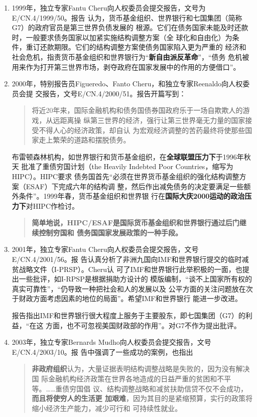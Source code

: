 \begin{enumerate}
\item 1999年，独立专家Fantu Cheru向人权委员会提交报告，文号为E/CN.4/1999/50。报告
  认为，货币基金组织、世界银行和七国集团（简称G7）的政府官员是第三世界负债发展的
  根源。它们在债务国家未能及时还款时，一般要求债务国家以加紧实施结构调整方案（全
  球化和自由化）为条件，重订还款期限。它们的结构调整方案使债务国家陷入更为严重的
  经济和社会危机，指责货币基金组织和世界银行为“\textbf{新自由派反革命}”，“债务
  危机被用来作为打开第三世界市场，剥夺政府在国家发展中的作用的方便借口”。

\item 2000年，特别报告员Figueredo、Fanto Cheru，和独立专家Reenaldo向人权委员会提
  交报告，文号E/CN.4/2000/51。报告开篇写到：
  \begin{quotation}
    将近20年来，国际金融机构和债务国债券国政府乐于一场自欺欺人的游戏，从远距离操
    纵第三世界的经济，强行让第三世界毫无力量的国家接受不得人心的经济政策，却自认
    为宏观经济调整的苦药最终将使那些国家走上繁荣的道路和摆脱债务。
  \end{quotation}
  布雷顿森林机构，如世界银行和货币基金组织，在\textbf{全球联盟压力下}于1996年秋天
  批准了重债穷国计划（the Heavily Indebted Poor Countries，缩写为HIPC）。HIPC要求
  债务国首先“必须在世界货币基金组织的强化结构调整方案（ESAF）下完成六年的结构调
  整，然后作出减免债务的决定要满足一些额外条件”。1999年春，货币基金组织和世界银
  行在\textbf{国际大庆2000运动的政治压力下}对HIPC作检讨。
  \begin{quotation}
    \textbf{简单地说，HIPC/ESAF是国际货币基金组织和世界银行通过后门继续控制穷国和
      债务国国家发展政策的一种手段。}
  \end{quotation}

\item 2001年，独立专家Fantu Cheru向人权委员会提交报告，文号E/CN.4/2001/56。报
  告认真分析了非洲九国向IMF和世界银行提交的临时减贫战略文件（I-PRSP）。Cheru认
  可了IMF和世界银行此举积极的一面，也提出一些批评，如I-RPSP是根据捐助方设计的
  模版编制，“谈不上国家所有权的真实可靠性”，“仍导致一种把社会和人的发展以及
  公平方面的关注问题放在次于财政方面考虑因素的地位的局面”。希望IMF和世界银行
  能进一步改进。

  报告指出IMF和世界银行很大程度上服务于主要股东，即七国集团（G7）的利益，“在这
  方面，也不可忽视美国财政部的作用”。对G7不作为提出批评。

\item 2003年，独立专家Bernards Mudho向人权委员会提交报告，文号E/CN.4/2003/10。报
  告中强调了一些成功的案例，也指出
  \begin{quotation}
    \textbf{非政府组织}认为，大量证据表明结构调整战略是失败的，因为没有解决国
    际金融机构经济政策在世界各地造成的日益严重的贫困和不平等。……重债穷国倡
    议、结构调整战略和减贫扶助信贷不仅不会成功，\textbf{而且将使穷人的生活更
      加艰难}，因为其目的是紧缩预算，实行的政策将缩小经济生产能力，减少可行和
    可持续性就业。


\end{quotation}
\end{enumerate}
